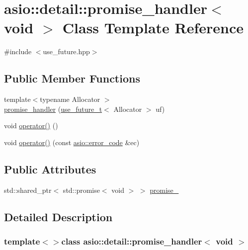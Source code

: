 \hypertarget{classasio_1_1detail_1_1promise__handler_3_01void_01_4}{}\section{asio\+:\+:detail\+:\+:promise\+\_\+handler$<$ void $>$ Class Template Reference}
\label{classasio_1_1detail_1_1promise__handler_3_01void_01_4}


{\ttfamily \#include $<$use\+\_\+future.\+hpp$>$}

\subsection*{Public Member Functions}
\begin{DoxyCompactItemize}
\item 
{\footnotesize template$<$typename Allocator $>$ }\\\hyperlink{classasio_1_1detail_1_1promise__handler_3_01void_01_4_ac3178752ee1769ccb9c4582904f54739}{promise\+\_\+handler} (\hyperlink{classasio_1_1use__future__t}{use\+\_\+future\+\_\+t}$<$ Allocator $>$ uf)
\item 
void \hyperlink{classasio_1_1detail_1_1promise__handler_3_01void_01_4_a872ccd203572d4125d33b27017c15941}{operator()} ()
\item 
void \hyperlink{classasio_1_1detail_1_1promise__handler_3_01void_01_4_a1f0c0fd9bcbba572abfe376c41721ffb}{operator()} (const \hyperlink{classasio_1_1error__code}{asio\+::error\+\_\+code} \&ec)
\end{DoxyCompactItemize}
\subsection*{Public Attributes}
\begin{DoxyCompactItemize}
\item 
std\+::shared\+\_\+ptr$<$ std\+::promise$<$ void $>$ $>$ \hyperlink{classasio_1_1detail_1_1promise__handler_3_01void_01_4_a707247d64f616a7295b79ad8086cef69}{promise\+\_\+}
\end{DoxyCompactItemize}


\subsection{Detailed Description}
\subsubsection*{template$<$$>$class asio\+::detail\+::promise\+\_\+handler$<$ void $>$}



